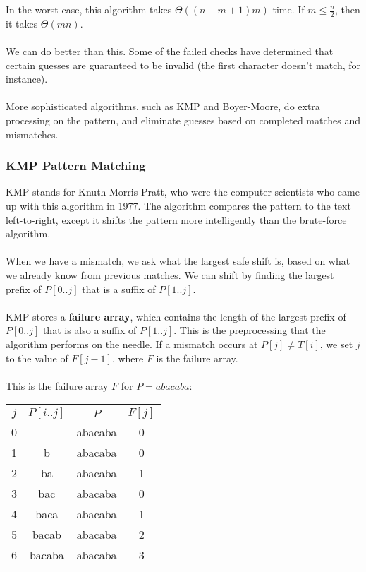 \documentclass[]{article}
\theoremstyle{definition}
\begin{document}
				In the worst case, this algorithm takes $\Theta((n - m + 1)m)$ time. If $m \le \frac{n}{2}$, then it takes $\Theta(mn)$.
				\\ \\
				We can do better than this. Some of the failed checks have determined that certain guesses are guaranteed to be invalid (the first character doesn't match, for instance).
				\\ \\
				More sophisticated algorithms, such as KMP and Boyer-Moore, do extra processing on the pattern, and eliminate guesses based on completed matches and mismatches.
			\subsubsection{KMP Pattern Matching}
				KMP stands for Knuth-Morris-Pratt, who were the computer scientists who came up with this algorithm in 1977. The algorithm compares the pattern to the text left-to-right, except it shifts the pattern more intelligently than the brute-force algorithm.
				\\ \\
				When we have a mismatch, we ask what the largest safe shift is, based on what we already know from previous matches. We can shift by finding the largest prefix of $P[0..j]$ that is a suffix of $P[1..j]$.
				\\ \\
				KMP stores a \textbf{failure array}, which contains the length of the largest prefix of $P[0..j]$ that is also a suffix of $P[1..j]$. This is the preprocessing that the algorithm performs on the needle. If a mismatch occurs at $P[j] \ne T[i]$, we set $j$ to the value of $F[j - 1]$, where $F$ is the failure array.
				\\ \\
				This is the failure array $F$ for $P = abacaba$:
				\begin{center}
					\begin{tabular}{|c|c|c|c|}
						\hline
						$j$ & $P[i..j]$ & $P$ & $F[j]$ \\ \hline
						0 & & abacaba & 0 \\
						1 & b & abacaba & 0 \\
						2 & ba & abacaba & 1 \\
						3 & bac & abacaba & 0 \\
						4 & baca & abacaba & 1 \\
						5 & bacab & abacaba & 2 \\
						6 & bacaba & abacaba & 3 \\ \hline
					\end{tabular}
				\end{center}
\end{document}
